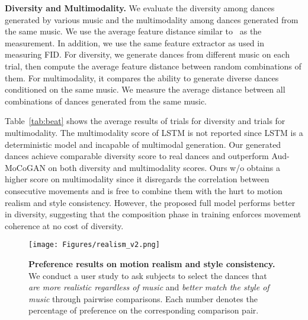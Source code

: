 \documentclass{article}
\newlength\figmargin
\newcommand{\tabref}[1]{Table~\ref{tab:#1}}
\begin{document}
\textbf{Diversity and Multimodality.}
We evaluate the diversity among dances generated by various music and the multimodality among dances generated from the same music.
We use the average feature distance similar to~\cite{zhang2018perceptual} as the measurement. 
In addition, we use the same feature extractor as used in measuring FID.
For diversity, we generate  dances from different music on each trial, then compute the average feature distance between  random combinations of them.
For multimodality, it compares the ability to generate diverse dances conditioned on the same music.
We measure the average distance between all combinations of  dances generated from the same music.


\tabref{beat} shows the average results of  trials for diversity and  trials for multimodality.
The multimodality score of LSTM is not reported since LSTM is a deterministic model and incapable of multimodal generation.
Our generated dances achieve comparable diversity score to real dances and outperform Aud-MoCoGAN on both diversity and multimodality scores.
Ours w/o  obtains a higher score on multimodality since it disregards the correlation between consecutive movements and is free to combine them with the hurt to motion realism and style consistency.
However, the proposed full model performs better in diversity, suggesting that the composition phase in training enforces movement coherence at no cost of diversity.


\begin{figure}
\center
\texttt{[image: Figures/realism\_v2.png]}
\caption{\textbf{Preference results on motion realism and style consistency.}
We conduct a user study to ask subjects to select the dances that \emph{are more realistic regardless of music} and \emph{better match the style of music} through pairwise comparisons.
Each number denotes the percentage of preference on the corresponding comparison pair.
}
\label{fig:userstudy}
\vspace{\figmargin}
\end{figure}
\end{document}
